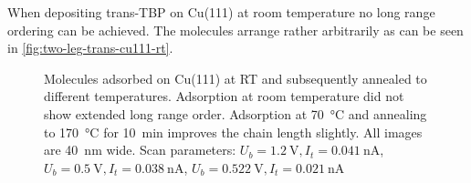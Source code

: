 	When depositing trans-TBP on Cu(111) at room temperature no long range ordering can be achieved. The molecules arrange rather arbitrarily as can be seen in  \autoref{fig:two-leg-trans-cu111-rt}.
	
	\begin{figure}[h]
		\centering
		\caption{Molecules adsorbed on Cu(111) at RT and subsequently annealed to different temperatures.  Adsorption at room temperature did not show extended long range order.   Adsorption at \SI{70}{\celsius} and  annealing to \SI{170}{\celsius} for \SI{10}{\minute} improves the chain length slightly. All images are \SI{40}{\nano \meter} wide. Scan parameters:  $U_b=\SI{1.2}{\volt}, I_t=\SI{0.041}{\nano \ampere}$,  $U_b=\SI{0.5}{\volt}, I_t=\SI{0.038}{\nano \ampere}$,  $U_b=\SI{0.522}{\volt}, I_t=\SI{0.021}{\nano \ampere}$}
		\label{fig:two-leg-trans-cu111}
	\end{figure}
	
